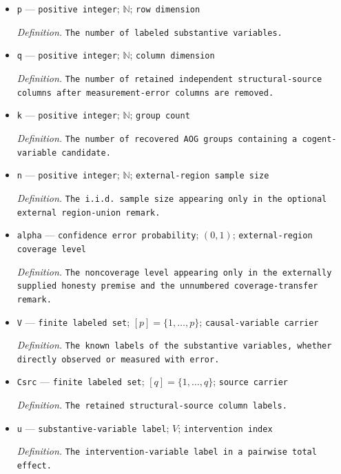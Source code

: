 \documentclass{article}
\begin{document}
\begin{itemize}
  \item \texttt{p} --- \texttt{positive integer}; \(\mathbb N\); \texttt{row dimension}
  \par\smallskip\noindent\emph{Definition.} \texttt{The number of labeled substantive variables.}
  \item \texttt{q} --- \texttt{positive integer}; \(\mathbb N\); \texttt{column dimension}
  \par\smallskip\noindent\emph{Definition.} \texttt{The number of retained independent structural-\allowbreak{}source columns after measurement-\allowbreak{}error columns are removed.}
  \item \texttt{k} --- \texttt{positive integer}; \(\mathbb N\); \texttt{group count}
  \par\smallskip\noindent\emph{Definition.} \texttt{The number of recovered AOG groups containing a cogent-\allowbreak{}variable candidate.}
  \item \texttt{n} --- \texttt{positive integer}; \(\mathbb N\); \texttt{external-\allowbreak{}region sample size}
  \par\smallskip\noindent\emph{Definition.} \texttt{The i.i.d. sample size appearing only in the optional external region-\allowbreak{}union remark.}
  \item \texttt{alpha} --- \texttt{confidence error probability}; \((0,1)\); \texttt{external-\allowbreak{}region coverage level}
  \par\smallskip\noindent\emph{Definition.} \texttt{The noncoverage level appearing only in the externally supplied honesty premise and the unnumbered coverage-\allowbreak{}transfer remark.}
  \item \texttt{V} --- \texttt{finite labeled set}; \([p]=\{1,\ldots,p\}\); \texttt{causal-\allowbreak{}variable carrier}
  \par\smallskip\noindent\emph{Definition.} \texttt{The known labels of the substantive variables,\allowbreak{} whether directly observed or measured with error.}
  \item \texttt{Csrc} --- \texttt{finite labeled set}; \([q]=\{1,\ldots,q\}\); \texttt{source carrier}
  \par\smallskip\noindent\emph{Definition.} \texttt{The retained structural-\allowbreak{}source column labels.}
  \item \texttt{u} --- \texttt{substantive-\allowbreak{}variable label}; \(V\); \texttt{intervention index}
  \par\smallskip\noindent\emph{Definition.} \texttt{The intervention-\allowbreak{}variable label in a pairwise total effect.}

\end{itemize}
\end{document}

